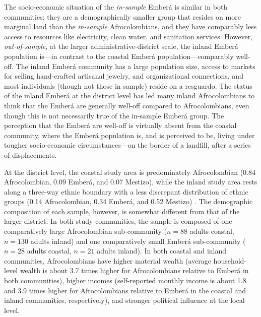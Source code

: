 \documentclass[bibauthoryear]{aa}
\begin{document}
The socio-economic situation of the \emph{in-sample} Ember\'a is similar in both communities: they are a demographically smaller group that resides on more marginal land than the \emph{in-sample} Afrocolombians, and they have comparably less access to resources like electricity, clean water, and sanitation services.  However,  \emph{out-of-sample}, at the larger administrative-district scale, the inland Ember\'a population is---in contrast to the coastal Ember\'a population---comparably well-off.  The inland Ember\'a community has a large population size, access to markets for selling hand-crafted artisanal jewelry,  and organizational connections, and most individuals (though not those in sample) reside on a resguardo.  The status of the inland Ember\'a at the district level has led many inland Afrocolombians to think that the Ember\'a are generally well-off compared to Afrocolombians, even though this is not necessarily true of the in-sample Ember\'a group. The perception that the Ember\'a are well-off is virtually absent from the coastal community, where the Ember\'a population is, and is  perceived to be, living under tougher  socio-economic circumstances---on the border of a landfill, after a series of displacements.

At the district level, the coastal study area is predominately Afrocolombian (0.84 Afrocolombian, 0.09 Ember\'a, and 0.07 Mestizo), while the inland study area rests along a three-way ethnic boundary with a less discrepant distribution of ethnic groups (0.14 Afrocolombian, 0.34 Ember\'a, and 0.52 Mestizo) \citep{DAN051}. The demographic composition of each sample, however, is somewhat different from that of the larger district. In both study communities, the sample is composed of one comparatively large Afrocolombian sub-community ($n=88$ adults coastal, $n=130$ adults inland) and one comparatively small Ember\'a sub-community  ($n=28$ adults coastal, $n=21$ adults inland). In both coastal and inland communities, Afrocolombians have higher material wealth (average household-level wealth is about 3.7 times higher for Afrocolombians relative to Ember\'a in both communities), higher incomes (self-reported monthly income is about 1.8 and 3.9 times higher for Afrocolombians relative to Ember\'a in the coastal and inland communities, respectively), and stronger political influence at the local level. %
\end{document}
